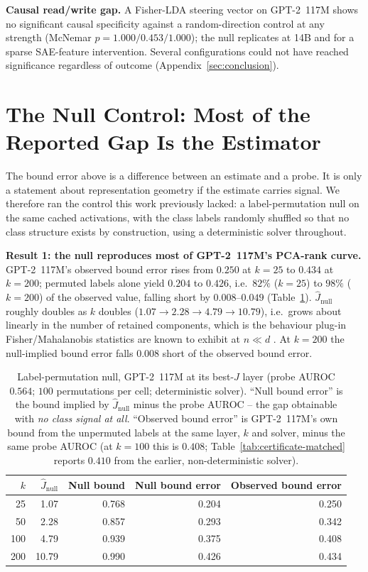 \documentclass[onecolumn]{jmlr}
\begin{document}
\textbf{Causal read/write gap.} A Fisher-LDA steering vector on GPT-2~117M
shows no significant causal specificity against a random-direction control at
any strength (McNemar $p=1.000/0.453/1.000$); the null replicates at 14B and
for a sparse SAE-feature intervention. Several configurations could not have
reached significance regardless of outcome (Appendix~\ref{sec:conclusion}).

\section{The Null Control: Most of the Reported Gap Is the Estimator}
\label{sec:null}

The bound error above is a difference between an estimate and a probe. It is
only a statement about representation geometry if the estimate carries signal.
We therefore ran the control this work previously lacked: a label-permutation
null on the same cached activations, with the class labels randomly shuffled so
that no class structure exists by construction, using a deterministic solver
throughout.

\textbf{Result 1: the null reproduces most of GPT-2~117M's PCA-rank curve.}
GPT-2~117M's observed bound error rises from $0.250$ at $k{=}25$ to $0.434$
at $k{=}200$; permuted labels alone yield $0.204$ to $0.426$, i.e.\ $82\%$
($k{=}25$) to $98\%$ ($k{=}200$) of the observed value, falling short by
$0.008$--$0.049$ (Table~\ref{tab:null}). $\hat J_{\text{null}}$ roughly doubles as $k$ doubles
($1.07 \to 2.28 \to 4.79 \to 10.79$), i.e.\ grows about linearly in the number
of retained components, which is the behaviour plug-in Fisher/Mahalanobis
statistics are known to exhibit at $n{\ll}d$
\citep{bickel2004some,fan2008high}. At $k{=}200$ the null-implied bound error
falls $0.008$ short of the observed bound error.

\begin{table}[!htbp]
\centering
\caption{Label-permutation null, GPT-2~117M at its best-$J$ layer
  (probe AUROC $0.564$; $100$ permutations per cell; deterministic solver).
  ``Null bound error'' is the bound implied by $\hat J_{\text{null}}$ minus the
  probe AUROC -- the gap obtainable with \emph{no class signal at all}.
  ``Observed bound error'' is GPT-2~117M's own bound from the unpermuted
  labels at the same layer, $k$ and solver, minus the same probe AUROC
  (at $k{=}100$ this is $0.408$; Table~\ref{tab:certificate-matched}
  reports $0.410$ from the earlier, non-deterministic solver).}
\label{tab:null}
\small
\begin{tabular}{rrrrr}
\toprule
$k$ & $\hat J_{\text{null}}$ & Null bound & Null bound error & \textbf{Observed bound error} \\
\midrule
25  & 1.07  & 0.768 & 0.204 & 0.250 \\
50  & 2.28  & 0.857 & 0.293 & 0.342 \\
100 & 4.79  & 0.939 & 0.375 & 0.408 \\
200 & 10.79 & 0.990 & 0.426 & 0.434 \\
\bottomrule
\end{tabular}
\end{table}
\end{document}
